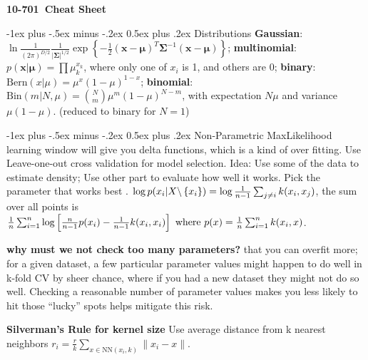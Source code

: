 \documentclass[10pt,landscape]{article}
\makeatletter
\newcommand{\vect}[1]{\boldsymbol{#1}}
\renewcommand{\section}{\@startsection{section}{1}{0mm}%
                                {-1ex plus -.5ex minus -.2ex}%
                                {0.5ex plus .2ex}%
                                {\normalfont\large\bfseries}}
\makeatother
\begin{document}
\raggedright
\footnotesize
\begin{multicols}{3}


\setlength{\premulticols}{1pt}
\setlength{\postmulticols}{1pt}
\setlength{\multicolsep}{1pt}
\setlength{\columnsep}{2pt}

\begin{center}
     \Large{\textbf{10-701\ Cheat Sheet}} \\
\end{center}

\section{Distributions}
\textbf{Gaussian}: $\ln\frac{1}{(2\pi)^{D/2}} \frac{1}{|\boldsymbol{\Sigma}|^{1/2}} \exp\left\{-\frac{1}{2}(\vect{x} - \boldsymbol{\mu})^T \boldsymbol{\Sigma}^{-1} (\vect{x} - \boldsymbol{\mu}) \right\}$; \textbf{multinomial}: $p(\vect{x}|\vect{\mu}) = \prod \mu_k^{x_k}$, where only one of $x_i$ is 1, and others are 0; \textbf{binary}: $\mathrm{Bern}(x|\mu) = \mu^x (1-\mu)^{1-x}$; \textbf{binomial}: $\mathrm{Bin}(m|N,\mu) = \binom{N}{m} \mu^m(1-\mu)^{N-m}$, with expectation $N\mu$ and variance $\mu(1-\mu)$. (reduced to binary for $N=1$) 

\section{Non-Parametric}
MaxLikelihood learning window will give you delta functions, which is a kind of over fitting. Use Leave-one-out cross validation for model selection. Idea: Use some of the data to estimate density; Use other part to evaluate how well it works. Pick the parameter that works best .
$\log p(x_i|X\backslash\cbr{x_i}) = \log \frac{1}{n-1} \sum_{j \neq i} k(x_i, x_j)$, the sum over all points is $\frac{1}{n} \sum_{i=1}^n \log \sbr{\frac{n}{n-1} p(x_i) - \frac{1}{n-1} k(x_i, x_i)} \text{ where } p(x) = \frac{1}{n} \sum_{i=1}^n k(x_i, x)$.

\textbf{why must we not check too many parameters?} that you can overfit more; for a given dataset, a few particular parameter values might happen to do well in k-fold CV by sheer chance, where if you had a new dataset they might not do so well. Checking a reasonable number of parameter values makes you less likely to hit those ``lucky'' spots helps mitigate this risk.

\textbf{Silverman's Rule for kernel size} Use average distance from k nearest neighbors $r_i = \frac{r}{k} \sum_{x \in \mathrm{NN}(x_i, k)} \|x_i - x\|$.


\end{multicols}
\end{document}
